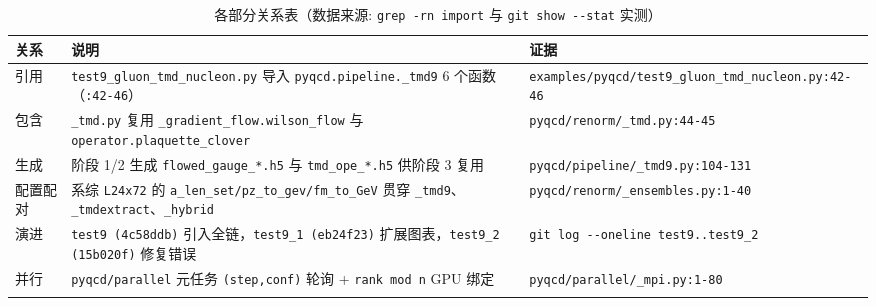 \documentclass[UTF8]{ctexart}
\begin{document}
\small
\begin{xltabular}{\textwidth}{lXl}
\toprule
\textcolor{relation}{关系} & 说明 & 证据 \\
\midrule
\endhead
引用 & \texttt{\nolinkurl{test9\_gluon\_tmd\_nucleon.py}} 导入 \texttt{\nolinkurl{pyqcd.pipeline.\_tmd9}} 6 个函数（\texttt{\nolinkurl{:42-46}}） & \texttt{\nolinkurl{examples/pyqcd/test9\_gluon\_tmd\_nucleon.py:42-46}} \\
包含 & \texttt{\nolinkurl{\_tmd.py}} 复用 \texttt{\nolinkurl{\_gradient\_flow.wilson\_flow}} 与 \texttt{\nolinkurl{operator.plaquette\_clover}} & \texttt{\nolinkurl{pyqcd/renorm/\_tmd.py:44-45}} \\
生成 & 阶段 1/2 生成 \texttt{\nolinkurl{flowed\_gauge\_*.h5}} 与 \texttt{\nolinkurl{tmd\_ope\_*.h5}} 供阶段 3 复用 & \texttt{\nolinkurl{pyqcd/pipeline/\_tmd9.py:104-131}} \\
配置配对 & 系综 \texttt{\nolinkurl{L24x72}} 的 \texttt{\nolinkurl{a\_len\_set/pz\_to\_gev/fm\_to\_GeV}} 贯穿 \texttt{\nolinkurl{\_tmd9}}、\texttt{\nolinkurl{\_tmdextract}}、\texttt{\nolinkurl{\_hybrid}} & \texttt{\nolinkurl{pyqcd/renorm/\_ensembles.py:1-40}} \\
演进 & \texttt{\nolinkurl{test9 (4c58ddb)}} 引入全链，\texttt{\nolinkurl{test9\_1 (eb24f23)}} 扩展图表，\texttt{\nolinkurl{test9\_2 (15b020f)}} 修复错误 & \texttt{\nolinkurl{git log --oneline test9..test9\_2}} \\
并行 & \texttt{\nolinkurl{pyqcd/parallel}} 元任务 \texttt{\nolinkurl{(step,conf)}} 轮询 + \texttt{\nolinkurl{rank mod n}} GPU 绑定 & \texttt{\nolinkurl{pyqcd/parallel/\_mpi.py:1-80}} \\
\bottomrule
\caption{各部分关系表（数据来源: \texttt{\nolinkurl{grep -rn import}} 与 \texttt{\nolinkurl{git show --stat}} 实测）}
\end{xltabular}
\end{document}
